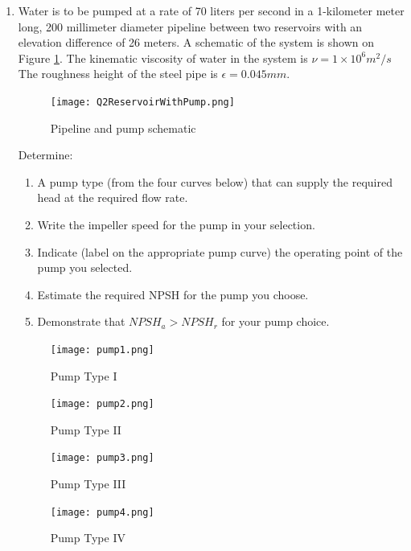 \documentclass[12pt]{article}
\begin{document}
\begin{enumerate}
\item Water is to be pumped at a rate of 70 liters per second in a 1-kilometer meter long, 200 millimeter diameter pipeline between two reservoirs with an elevation difference of 26 meters. A schematic of the system is shown on Figure \ref{fig:Q2ReservoirWithPump}. The kinematic viscosity of water in the system is $\nu = 1 \times 10^{6} m^2/s$ The
roughness height of the steel pipe is $\epsilon = 0.045 mm$.
\begin{figure}[h!] %
\centering
   \texttt{[image: Q2ReservoirWithPump.png]}
   \caption{Pipeline and pump schematic}
   \label{fig:Q2ReservoirWithPump} 
\end{figure}

Determine:
\begin{enumerate}
\item A pump type (from the four curves below) that can supply the required head at the required flow rate.
\item Write the impeller speed for the pump in your selection.
\item Indicate (label on the appropriate pump curve) the operating point of the pump you selected.
\item Estimate the required NPSH for the pump you choose.
\item Demonstrate that $NPSH_a > NPSH_r$ for your pump choice.
\end{enumerate}


\begin{figure}[h!] %
\centering
   \texttt{[image: pump1.png]}
   \caption{Pump Type I}
   \label{fig:Pump1} 
\end{figure}

\begin{figure}[h!] %
\centering
   \texttt{[image: pump2.png]}
   \caption{Pump Type II}
   \label{fig:Pump2} 
\end{figure}

\begin{figure}[h!] %
\centering
   \texttt{[image: pump3.png]}
   \caption{Pump Type III}
   \label{fig:Pump3} 
\end{figure}

\begin{figure}[h!] %
\centering
   \texttt{[image: pump4.png]}
   \caption{Pump Type IV}
   \label{fig:Pump4} 
\end{figure}

\end{enumerate}
\end{document}
